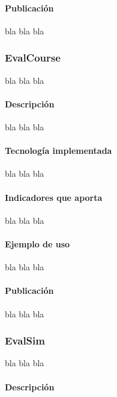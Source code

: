 \paragraph*{Publicación}

bla bla bla

\subsubsection{EvalCourse}

bla bla bla

\paragraph*{Descripción}

bla bla bla

\paragraph*{Tecnología implementada}

bla bla bla

\paragraph*{Indicadores que aporta}

bla bla bla

\paragraph*{Ejemplo de uso}

bla bla bla

\paragraph*{Publicación}

bla bla bla

\subsubsection{EvalSim}

bla bla bla

\paragraph*{Descripción}


